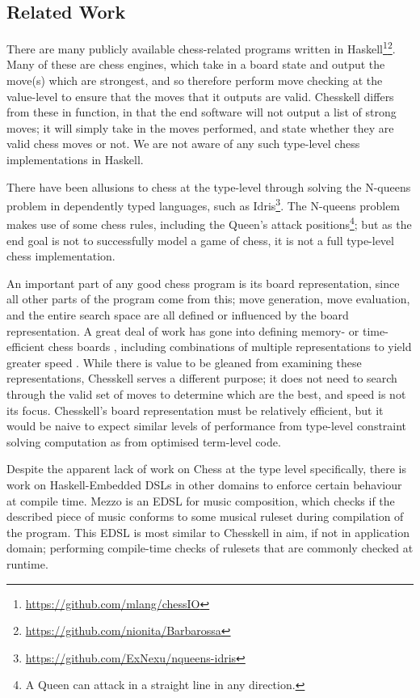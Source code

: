 \documentclass[12pt, a4paper, bibliography=totocnumbered]{scrartcl}
\begin{document}

\subsection{Related Work}

There are many publicly available chess-related programs written in Haskell\footnote{\url{https://github.com/mlang/chessIO}}\footnote{\url{https://github.com/nionita/Barbarossa}}. Many of these are chess engines, which take in a board state and output the move(s) which are strongest, and so therefore perform move checking at the value-level to ensure that the moves that it outputs are valid. Chesskell differs from these in function, in that the end software will not output a list of strong moves; it will simply take in the moves performed, and state whether they are valid chess moves or not. We are not aware of any such type-level chess implementations in Haskell.

There have been allusions to chess at the type-level through solving the N-queens problem in dependently typed languages, such as Idris\footnote{\url{https://github.com/ExNexu/nqueens-idris}}. The N-queens problem makes use of some chess rules, including the Queen's attack positions\footnote{A Queen can attack in a straight line in any direction.}; but as the end goal is not to successfully model a game of chess, it is not a full type-level chess implementation.

An important part of any good chess program is its board representation, since all other parts of the program come from this; move generation, move evaluation, and the entire search space are all defined or influenced by the board representation. A great deal of work has gone into defining memory- or time-efficient chess boards \cite{bitboard} \cite{searchtables}, including combinations of multiple representations to yield greater speed \cite{bitandccr}. While there is value to be gleaned from examining these representations, Chesskell serves a different purpose; it does not need to search through the valid set of moves to determine which are the best, and speed is not its focus. Chesskell's board representation must be relatively efficient, but it would be naive to expect similar levels of performance from type-level constraint solving computation as from optimised term-level code.

Despite the apparent lack of work on Chess at the type level specifically, there is work on Haskell-Embedded DSLs in other domains to enforce certain behaviour at compile time. Mezzo \cite{mezzohaskellsymposium} is an EDSL for music composition, which checks if the described piece of music conforms to some musical ruleset during compilation of the program. This EDSL is most similar to Chesskell in aim, if not in application domain; performing compile-time checks of rulesets that are commonly checked at runtime.
\end{document}
